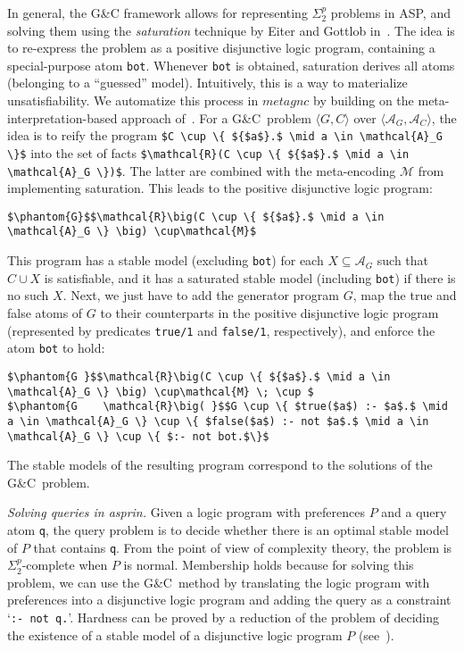 \documentclass[a4paper,USenglish]{oasics-v2016}
\newcommand{\lm}[1]{\lstinline[mathescape=true]!#1!}
\newcommand{\gc}[0]{G{\&}C}
\newcommand{\sysfont}{\textit}
\newcommand{\asprin}{\sysfont{asprin}}
\begin{document}
%
In general, the G{\&}C framework \cite{eitpol06a} 
allows for representing $\Sigma^p_2$ problems in ASP, 
and solving them using the \textit{saturation} technique by Eiter and Gottlob in~\cite{eitgot95a}.
%
The idea is to re-express the problem as a positive disjunctive logic program, containing a special-purpose atom \lm{bot}.
%
Whenever \lm{bot} is obtained, saturation derives all atoms (belonging to a ``guessed'' model).
%
Intuitively, this is a way to materialize unsatisfiability.
%
We automatize this process in $\mathit{metagnc}$ by building on the meta-interpretation-based approach of~\cite{gekasc11b}.
%
For a \gc\ problem $\langle G, C \rangle$ over $\langle \mathcal{A}_G,\mathcal{A}_C\rangle$,
the idea is to reify the program
\lstinline[mathescape=true]!$C \cup \{ ${$a$}.$ \mid a \in \mathcal{A}_G \}$!
into the set of facts
\lstinline[mathescape=true]!$\mathcal{R}(C \cup \{ ${$a$}.$ \mid a \in \mathcal{A}_G \})$!.
%
The latter are combined with the meta-encoding $\mathcal{M}$ from~\cite{gekasc11b} implementing saturation.
%
This leads to the positive disjunctive logic program:
\begin{lstlisting}[mathescape=true]
$\phantom{G}$$\mathcal{R}\big(C \cup \{ ${$a$}.$ \mid a \in \mathcal{A}_G \} \big) \cup\mathcal{M}$
\end{lstlisting}
%
This program has a stable model (excluding \lm{bot}) for each $X \subseteq \mathcal{A}_G$ such that $C \cup X$ is satisfiable, 
and it has a saturated stable model (including \lm{bot}) if there is no such $X$.
%
%
Next, we just have to add the generator program $G$, 
map the true and false atoms of $G$ to their counterparts in the positive disjunctive logic program 
(represented by predicates \lm{true/1} and \lm{false/1}, respectively),
and enforce the atom \lm{bot} to hold:
\begin{lstlisting}[mathescape=true]
$\phantom{G }$$\mathcal{R}\big(C \cup \{ ${$a$}.$ \mid a \in \mathcal{A}_G \} \big) \cup\mathcal{M} \; \cup $
$\phantom{G    \mathcal{R}\big( }$$G \cup \{ $true($a$) :- $a$.$ \mid a \in \mathcal{A}_G \} \cup \{ $false($a$) :- not $a$.$ \mid a \in \mathcal{A}_G \} \cup \{ $:- not bot.$\}$
\end{lstlisting}
%
The stable models of the resulting program correspond to the solutions of the \gc\ problem.
%

\emph{Solving queries in \asprin.}
%
Given a logic program with preferences $P$ and a query atom \lm{q}, 
the query problem is to decide whether there is an optimal stable model of $P$ that contains \lm{q}.
%
From the point of view of complexity theory, the problem is $\Sigma^p_2$-complete when $P$ is normal.
%
Membership holds because for solving this problem, 
we can use the \gc\ method by
translating the logic program with preferences into a disjunctive logic program
and adding the query as a constraint `\lm{:- not q.}'.
%
Hardness can be proved by a reduction of the problem of deciding 
the existence of a stable model of a disjunctive logic program $P$ (see~\cite{roscwa16b}). %
\end{document}
